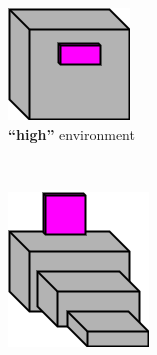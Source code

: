 \documentclass[12pt]{article}
\begin{document}
\begin{figure}[H]
\begin{subfigure}[t]{0.45\columnwidth}
    \begin{subfigure}[t]{0.45\columnwidth}
        \includegraphics[width=\textwidth]{images/HighFreeEnvironment.png}
        \caption{\textbf{``high''} environment}
    \end{subfigure} \ \ \ \ \ \
    \begin{subfigure}[t]{0.45\columnwidth}
        \includegraphics[width=\textwidth]{images/LedgeEnvironment.png}

\end{subfigure}
\end{subfigure}
\end{figure}
\end{document}

